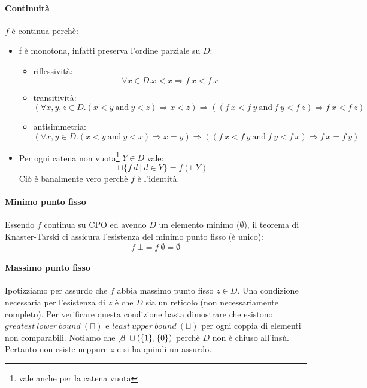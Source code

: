 \paragraph{Continuità} $f$ è continua perchè: 
\begin{itemize}
  \item f è monotona, infatti preserva l'ordine parziale su $D$:
  \begin{itemize}
    \item riflessività:
    $$
      \forall x \in D.x \lt x \Rightarrow f\ x \lt f\ x
    $$
    \item transitività:
    $$
      (\forall x,y,z \in D.(x \lt y\ \text{and}\ y \lt z) \Rightarrow
      x \lt z)
      \Rightarrow 
      ((f\ x \lt f\ y\ \text{and}\ f\ y \lt f\ z) \Rightarrow
      f\ x \lt f\ z)
    $$
    \item antisimmetria:
     $$
      (\forall x,y \in D.(x \lt y\ \text{and}\ y \lt x) \Rightarrow
      x = y)
      \Rightarrow 
      ((f\ x \lt f\ y\ \text{and}\ f\ y \lt f\ x) \Rightarrow
      f\ x = f\ y)
    $$
  \end{itemize}
  \item Per ogni catena non vuota\footnote{vale anche per la catena vuota} $Y \in D$ vale:
    $$ 
      \sqcup\{f\ d\ |\ d \in Y\} = f(\sqcup Y)
    $$
    Ciò è banalmente vero perchè $f$ è l'identità.
\end{itemize}
\paragraph{Minimo punto fisso}
Essendo $f$ continua su CPO  ed avendo $D$ un elemento minimo ($\emptyset$), il teorema di Knaster-Tarski ci 
assicura l'esistenza del minimo punto fisso (è unico):  
$$
f\ \bot = f\ \emptyset = \emptyset
$$

\paragraph{Massimo punto fisso}
Ipotizziamo per assurdo che $f$ abbia massimo punto fisso $z \in D$.
Una condizione necessaria per l'esistenza di $z$ è che $D$ sia un reticolo 
(non necessariamente completo). Per verificare questa condizione basta 
dimostrare che esistono $greatest\ lower\ bound\ (\sqcap)$ e 
$least\ upper\ bound\ (\sqcup)$ per ogni coppia di elementi non comparabili.
Notiamo che $\not \exists\ \sqcup(\{1\},\{0\})$ perchè $D$ non è chiuso all'insù. 
Pertanto non esiste neppure $z$ e si ha quindi un assurdo.

